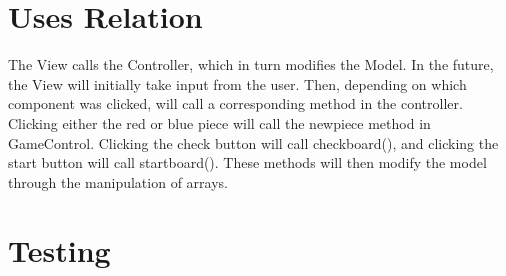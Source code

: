 \documentclass[12pt]{article}
\begin{document}
	\section{Uses Relation}
			\begin{figure}[!h]
				\centering
			\end{figure}
	The View calls the Controller, which in turn modifies the Model. In the future, the View will initially take input from the user. Then, depending on which component was clicked, will call a corresponding method in the controller. Clicking either the red or blue piece will call the newpiece method in GameControl. Clicking the check button will call checkboard(), and clicking the start button will call startboard(). These methods will then modify the model through the manipulation of arrays. \\
	\newpage	
	\section{Testing}
	
\end{document}
